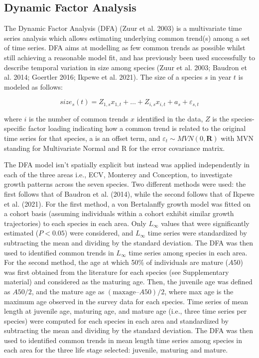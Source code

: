 \documentclass[
]{article}
\begin{document}
\hypertarget{dynamic-factor-analysis}{%
\subsection{Dynamic Factor Analysis}\label{dynamic-factor-analysis}}

The Dynamic Factor Analysis (DFA) (Zuur et al. 2003) is a multivariate
time series analysis which allows estimating underlying common trend(s)
among a set of time series. DFA aims at modelling as few common trends
as possible whilst still achieving a reasonable model fit, and has
previously been used successfully to describe temporal variation in size
among species (Zuur et al. 2003; Baudron et al. 2014; Goertler 2016;
Ikpewe et al. 2021). The size of a species \(s\) in year \(t\) is
modeled as follows:

\[
size_s(t)= Z_{1,s}x_{1,t}+\dots+Z_{i,s}x_{i,t}+ a_s+\varepsilon_{s,t} 
\]

where \(i\) is the number of common trends \(x\) identified in the data,
\(Z\) is the species-specific factor loading indicating how a common
trend is related to the original time series for that species, a is an
offset term, and \(\varepsilon_t \sim MVN(0, \textbf{R})\) with MVN
standing for Multivariate Normal and R for the error covariance matrix.

The DFA model isn't spatially explicit but instead was applied
independently in each of the three areas i.e., ECV, Monterey and
Conception, to investigate growth patterns across the seven species. Two
different methods were used: the first follows that of Baudron et al.
(2014), while the second follows that of Ikpewe et al. (2021). For the
first method, a von Bertalanffy growth model was fitted on a cohort
basis (assuming individuals within a cohort exhibit similar growth
trajectories) to each species in each area. Only \(L_{\infty}\) values
that were significantly estimated (\(P<0.05\)) were considered, and
\(L_{\infty}\) time series were standardized by subtracting the mean and
dividing by the standard deviation. The DFA was then used to identified
common trends in \(L_{\infty}\) time series among species in each area.
For the second method, the age at which 50\% of individuals are mature
(\(A50\)) was first obtained from the literature for each species (see
Supplementary material) and considered as the maturing age. Then, the
juvenile age was defined as \(A50/2\), and the mature age as
\((\mathrm{max age} – A50)/2\), where max age is the maximum age
observed in the survey data for each species. Time series of mean length
at juvenile age, maturing age, and mature age (i.e., three time series
per species) were computed for each species in each area and
standardized by subtracting the mean and dividing by the standard
deviation. The DFA was then used to identified common trends in mean
length time series among species in each area for the three life stage
selected: juvenile, maturing and mature.
\end{document}
